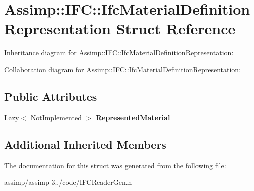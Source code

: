\hypertarget{struct_assimp_1_1_i_f_c_1_1_ifc_material_definition_representation}{\section{Assimp\+:\+:I\+F\+C\+:\+:Ifc\+Material\+Definition\+Representation Struct Reference}
\label{struct_assimp_1_1_i_f_c_1_1_ifc_material_definition_representation}
}


Inheritance diagram for Assimp\+:\+:I\+F\+C\+:\+:Ifc\+Material\+Definition\+Representation\+:


Collaboration diagram for Assimp\+:\+:I\+F\+C\+:\+:Ifc\+Material\+Definition\+Representation\+:
\subsection*{Public Attributes}
\begin{DoxyCompactItemize}
\item 
\hypertarget{struct_assimp_1_1_i_f_c_1_1_ifc_material_definition_representation_a4bcdcb3732269dfbf6bf7f6df30f8ffd}{\hyperlink{struct_assimp_1_1_s_t_e_p_1_1_lazy}{Lazy}$<$ \hyperlink{struct_assimp_1_1_i_f_c_1_1_not_implemented}{Not\+Implemented} $>$ {\bfseries Represented\+Material}}\label{struct_assimp_1_1_i_f_c_1_1_ifc_material_definition_representation_a4bcdcb3732269dfbf6bf7f6df30f8ffd}

\end{DoxyCompactItemize}
\subsection*{Additional Inherited Members}


The documentation for this struct was generated from the following file\+:\begin{DoxyCompactItemize}
\item 
assimp/assimp-\/3../code/I\+F\+C\+Reader\+Gen.\+h\end{DoxyCompactItemize}
